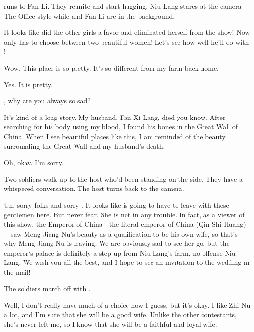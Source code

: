 \documentclass[letterpaper,12pt]{memoir}
\begin{document}
\begin{dida}
  \xishiname{} runs to Fan Li. They reunite and start hugging. Niu Lang stares at the camera The Office style while \xishiname{} and Fan Li are in the background.
\end{dida}

\host%
It looks like \xishiname{} did the other girls a favor and eliminated herself from the show! Now \niulangname{} only has to choose between two beautiful women! Let's see how well he'll do with \mengjiangnuname!


\scene{}

\niulang%
Wow. This place is so pretty. It's so different from my farm back home.

Yes. It is pretty.

\niulang%
\mengjiangnuname, why are you always so sad?

\mengjiangnu%
It's kind of a long story. My husband, Fan Xi Lang, died you know. After searching for his body using my blood, I found his bones in the Great Wall of China. When I see beautiful places like this, I am reminded of the beauty surrounding the Great Wall and my husband's death. 

Oh, okay. I'm sorry.

\begin{dida}
  Two soldiers walk up to the host who'd been standing on the side. They have a whispered conversation. The host turns back to the camera.
\end{dida}

\host%
Uh, sorry folks and sorry \niulangname{}. It looks like \mengjiangnuname{} is going to have to leave with these gentlemen here.  But never fear. She is not in any trouble. In fact, as a viewer of this show, the Emperor of China---the literal emperor of China (Qin Shi Huang)---saw Meng Jiang Nu's beauty as a qualification to be his own wife, so that's why Meng Jiang Nu is leaving. We are obviously sad to see her go, but the emperor‘s palace is definitely a step up from Niu Lang's farm, no offense Niu Lang. We wish you all the best, and I hope to see an invitation to the wedding in the mail!

\begin{dida}
  The soldiers march off with \mengjiangnuname.
\end{dida}

Well, I don't really have much of a choice now I guess, but it's okay. I like Zhi Nu a lot, and I'm sure that she will be a good wife. Unlike the other contestants, she's never left me, so I know that she will be a faithful and loyal wife.
\end{document}
